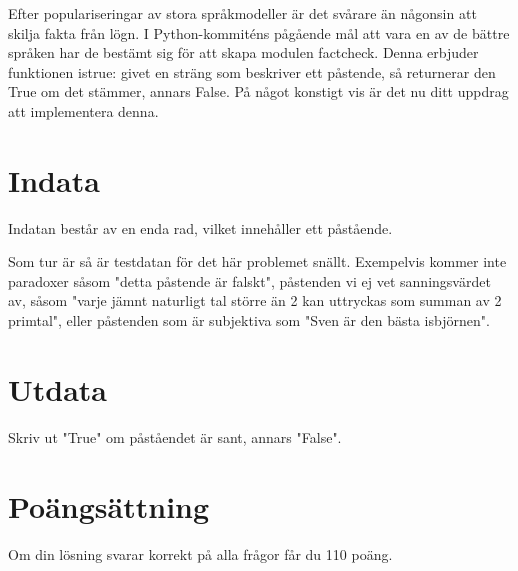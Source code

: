 \noindent
Efter populariseringar av stora språkmodeller är det svårare än någonsin att skilja
fakta från lögn. I Python-kommiténs pågående mål att vara en av de bättre språken har
de bestämt sig för att skapa modulen factcheck. Denna erbjuder funktionen istrue:
givet en sträng som beskriver ett påstende, så returnerar den True om det stämmer,
annars False. På något konstigt vis är det nu ditt uppdrag att implementera denna.


\section*{Indata}
\noindent
Indatan består av en enda rad, vilket innehåller ett påstående.

Som tur är så är testdatan för det här problemet snällt. Exempelvis kommer inte paradoxer
såsom "detta påstende är falskt", påstenden vi ej vet sanningsvärdet av, såsom "varje
jämnt naturligt tal större än 2 kan uttryckas som summan av 2 primtal", eller påstenden
som är subjektiva som "Sven är den bästa isbjörnen".

\section*{Utdata}
\noindent
Skriv ut "True" om påståendet är sant, annars "False".

\section*{Poängsättning}
Om din lösning svarar korrekt på alla frågor får du 110 poäng.
